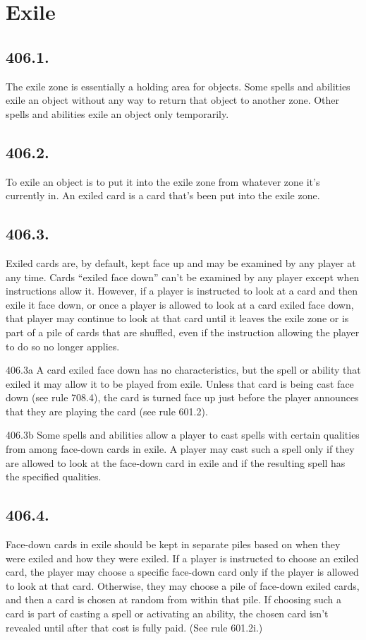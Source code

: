 \section{Exile}
\subsection*{406.1.}
The exile zone is essentially a holding area for objects. Some spells and abilities exile an object without any way to return that object to another zone. Other spells and abilities exile an object only temporarily.

\subsection*{406.2.}
To exile an object is to put it into the exile zone from whatever zone it’s currently in. An exiled card is a card that’s been put into the exile zone.

\subsection*{406.3.}
Exiled cards are, by default, kept face up and may be examined by any player at any time. Cards “exiled face down” can’t be examined by any player except when instructions allow it. However, if a player is instructed to look at a card and then exile it face down, or once a player is allowed to look at a card exiled face down, that player may continue to look at that card until it leaves the exile zone or is part of a pile of cards that are shuffled, even if the instruction allowing the player to do so no longer applies.

406.3a A card exiled face down has no characteristics, but the spell or ability that exiled it may allow it to be played from exile. Unless that card is being cast face down (see rule 708.4), the card is turned face up just before the player announces that they are playing the card (see rule 601.2).

406.3b Some spells and abilities allow a player to cast spells with certain qualities from among face-down cards in exile. A player may cast such a spell only if they are allowed to look at the face-down card in exile and if the resulting spell has the specified qualities.

\subsection*{406.4.}
Face-down cards in exile should be kept in separate piles based on when they were exiled and how they were exiled. If a player is instructed to choose an exiled card, the player may choose a specific face-down card only if the player is allowed to look at that card. Otherwise, they may choose a pile of face-down exiled cards, and then a card is chosen at random from within that pile. If choosing such a card is part of casting a spell or activating an ability, the chosen card isn’t revealed until after that cost is fully paid. (See rule 601.2i.)

